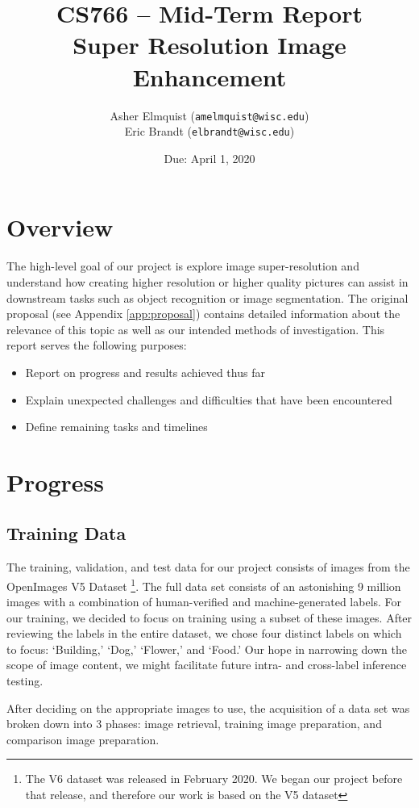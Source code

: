 \documentclass{article}
\title{CS766 -- Mid-Term Report \\ Super Resolution Image Enhancement}
\author{Asher Elmquist (\texttt{amelmquist@wisc.edu}) \\
Eric Brandt (\texttt{elbrandt@wisc.edu})
}
\date{Due: April 1, 2020}
\begin{document}
\maketitle

\section{Overview}

The high-level goal of our project is explore image super-resolution and understand how creating higher resolution or higher quality pictures can assist in downstream tasks such as object recognition or image segmentation. The original proposal (see Appendix \ref{app:proposal}) contains detailed information about the relevance of this topic as well as our intended methods of investigation.  This report serves the following purposes:
\begin{itemize}
    \item Report on progress and results achieved thus far
    \item Explain unexpected challenges and difficulties that have been encountered
    \item Define remaining tasks and timelines
\end{itemize}

\section{Progress}

\subsection{Training Data}
The training, validation, and test data for our project consists of images from the OpenImages V5 Dataset \cite{OpenImages}\footnote{The V6 dataset was released in February 2020. We began our project before that release, and therefore our work is based on the V5 dataset}.  The full data set consists of an astonishing 9 million images with a combination of human-verified and machine-generated labels. For our training, we decided to focus on training using a subset of these images. After reviewing the labels in the entire dataset, we chose four distinct labels on which to focus: `Building,' `Dog,' `Flower,' and `Food.' Our hope in narrowing down the scope of image content, we might facilitate future intra- and cross-label inference testing.

After deciding on the appropriate images to use, the acquisition of a data set was broken down into 3 phases: image retrieval, training image preparation, and comparison image preparation.
\end{document}
